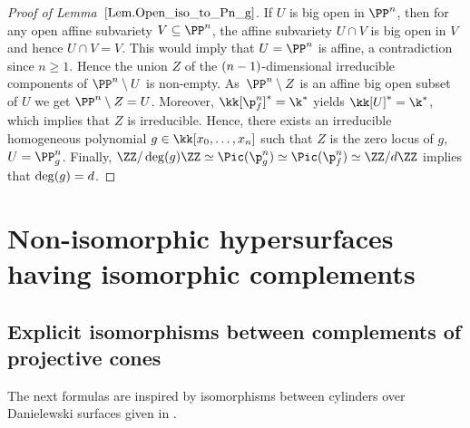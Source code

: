 \begin{proof}[Proof of Lemma~$\ref{Lem.Open_iso_to_Pn_g}$]
If $U$ is big open in $\PP^n$, then for any open affine subvariety $V \subseteq\nobreak \PP^n$,
the affine subvariety $U \cap V$ is big open in $V$ and hence $U \cap V = V$. This would imply that $U = \PP^n$
is affine, a contradiction since $n \geq 1$. Hence the union $Z$ of the $(n-\nobreak1)$-dimensional
irreducible components of $\PP^n \setminus U$ is non-empty. As~$\PP^n \setminus Z$ is an affine
big open subset of $U$ we get $\PP^n \setminus Z = U$.
Moreover, $\kk[\p^n_f]^\ast= \k^\ast$ yields $\kk[U]^\ast=\nobreak\k^\ast$, which implies that $Z$ is irreducible.
Hence, there exists an irreducible homogeneous polynomial $g \in \kk[x_0, \ldots, x_n]$ such that $Z$
is the zero locus of $g$, \ie $U =\nobreak \PP^n_g$. Finally, $\ZZ / \deg(g) \ZZ \simeq \Pic(\p^n_g) \simeq \Pic(\p^n_f) \simeq \ZZ / d \ZZ$ implies that $\deg(g) =\nobreak d$.
\end{proof}

\section{Non-isomorphic hypersurfaces having isomorphic complements}
\subsection{Explicit isomorphisms between complements of projective cones}

The next formulas are
inspired by isomorphisms between cylinders over Danielewski surfaces given in \cite{MoPo2021Isomorphisms-betwe}.


